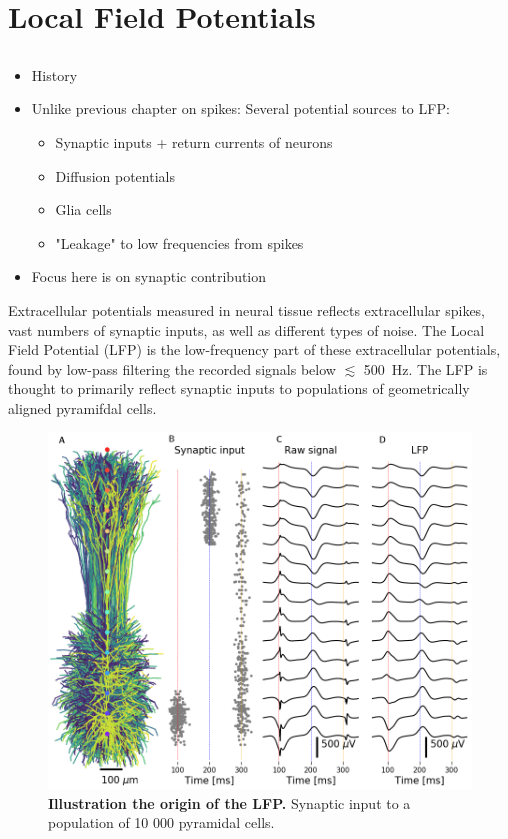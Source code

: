 \chapter{Local Field Potentials}
\label{chap:LFP}

\section{}

\begin{itemize}
\item History
\item Unlike previous chapter on spikes: Several potential sources to LFP:
\begin{itemize}
\item Synaptic inputs + return currents of neurons
\item Diffusion potentials
\item Glia cells
\item "Leakage" to low frequencies from spikes 
\end{itemize}
\item Focus here is on synaptic contribution
\end{itemize}

Extracellular potentials measured in neural tissue reflects extracellular spikes, vast numbers of synaptic inputs, as well as different types of noise. The Local Field Potential (LFP) is the low-frequency part of these extracellular potentials, found by low-pass filtering the recorded signals below $\lesssim$ 500~Hz. The LFP is thought to primarily reflect synaptic inputs to populations of geometrically aligned pyramifdal cells.

\begin{figure}[!ht]
\begin{center}
\includegraphics[width=.7\textwidth]{Figures/LFP/population_LFP.png}
\end{center}
\caption{\textbf{Illustration the origin of the LFP.}
Synaptic input to a population of 10 000 pyramidal cells.
}
\label{fig:LFP:LFP_pop_origin}
\end{figure}


